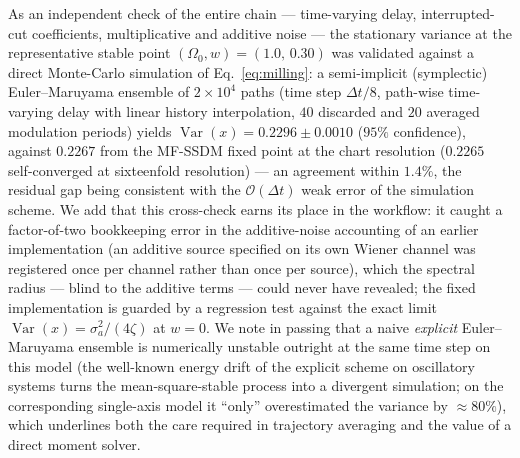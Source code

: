 \documentclass[preprint,12pt]{elsarticle}
\begin{document}
As an independent check of the entire chain --- time-varying delay, interrupted-cut coefficients, multiplicative and additive noise --- the stationary variance at the representative stable point $(\Omega_0, w) = (1.0,\, 0.30)$ was validated against a direct Monte-Carlo simulation of Eq.~\eqref{eq:milling}: a semi-implicit (symplectic) Euler--Maruyama ensemble of $2\times10^4$ paths (time step $\Delta t/8$, path-wise time-varying delay with linear history interpolation, $40$ discarded and $20$ averaged modulation periods) yields $\operatorname{Var}(x) = 0.2296 \pm 0.0010$ ($95\%$ confidence), against $0.2267$ from the MF-SSDM fixed point at the chart resolution ($0.2265$ self-converged at sixteenfold resolution) --- an agreement within $1.4\%$, the residual gap being consistent with the $\mathcal{O}(\Delta t)$ weak error of the simulation scheme. We add that this cross-check earns its place in the workflow: it caught a factor-of-two bookkeeping error in the additive-noise accounting of an earlier implementation (an additive source specified on its own Wiener channel was registered once per channel rather than once per source), which the spectral radius --- blind to the additive terms --- could never have revealed; the fixed implementation is guarded by a regression test against the exact limit $\operatorname{Var}(x) = \sigma_a^2/(4\zeta)$ at $w = 0$. We note in passing that a naive \emph{explicit} Euler--Maruyama ensemble is numerically unstable outright at the same time step on this model (the well-known energy drift of the explicit scheme on oscillatory systems turns the mean-square-stable process into a divergent simulation; on the corresponding single-axis model it ``only'' overestimated the variance by $\approx 80\%$), which underlines both the care required in trajectory averaging and the value of a direct moment solver.
\end{document}
